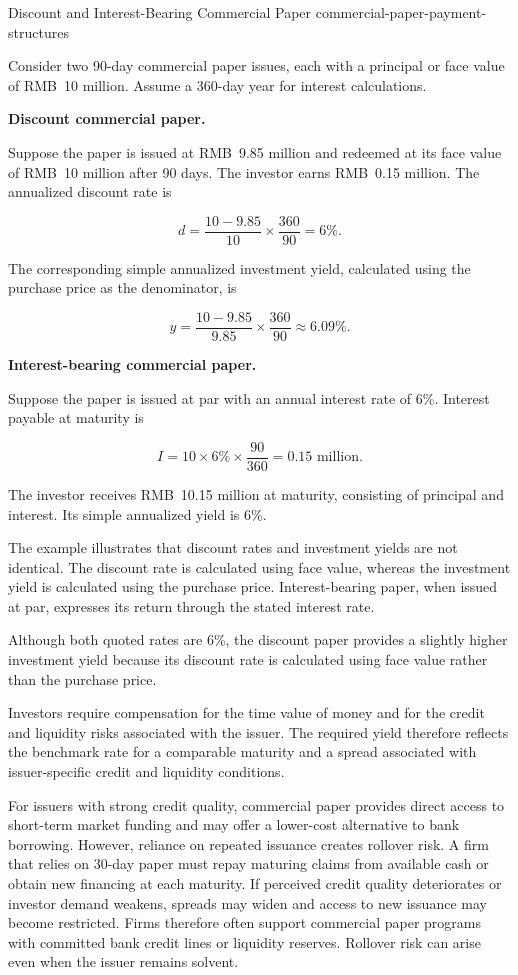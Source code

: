 \begin{example}{Discount and Interest-Bearing Commercial Paper}
{commercial-paper-payment-structures}

Consider two 90-day commercial paper issues, each with
a principal or face value of RMB~10 million. Assume
a 360-day year for interest calculations.

\textbf{Discount commercial paper.}

Suppose the paper is issued at RMB~9.85 million and
redeemed at its face value of RMB~10 million after
90 days. The investor earns RMB~0.15 million. The
annualized discount rate is

\[
d=\frac{10-9.85}{10}\times\frac{360}{90}
=6\%.
\]

The corresponding simple annualized investment yield,
calculated using the purchase price as the denominator,
is

\[
y=\frac{10-9.85}{9.85}\times\frac{360}{90}
\approx 6.09\%.
\]

\textbf{Interest-bearing commercial paper.}

Suppose the paper is issued at par with an annual
interest rate of 6\%. Interest payable at maturity is

\[
I=10\times 6\%\times\frac{90}{360}
=0.15\text{ million}.
\]

The investor receives RMB~10.15 million at maturity,
consisting of principal and interest. Its simple
annualized yield is 6\%.

The example illustrates that discount rates and
investment yields are not identical. The discount
rate is calculated using face value, whereas the
investment yield is calculated using the purchase
price. Interest-bearing paper, when issued at par,
expresses its return through the stated interest rate.

Although both quoted rates are 6\%, the discount
paper provides a slightly higher investment yield
because its discount rate is calculated using face
value rather than the purchase price.

\end{example}

Investors require compensation for the time value
of money and for the credit and liquidity risks
associated with the issuer. The required yield
therefore reflects the benchmark rate for a comparable
maturity and a spread associated with issuer-specific
credit and liquidity conditions.

For issuers with strong credit quality, commercial
paper provides direct access to short-term market
funding and may offer a lower-cost alternative to
bank borrowing. However, reliance on repeated issuance
creates rollover risk. A firm that relies on 30-day
paper must repay maturing claims from available cash
or obtain new financing at each maturity. If perceived
credit quality deteriorates or investor demand weakens,
spreads may widen and access to new issuance may become
restricted. Firms therefore often support commercial
paper programs with committed bank credit lines or
liquidity reserves. Rollover risk can arise even when
the issuer remains solvent.

